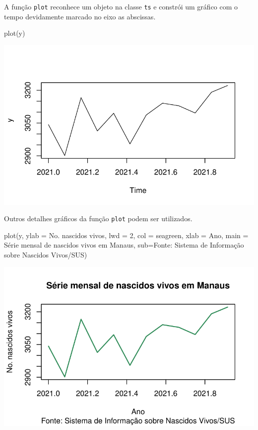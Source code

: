 \documentclass[
  letterpaper,
  DIV=11,
  numbers=noendperiod]{scrreprt}
\newenvironment{Shaded}{\begin{snugshade}}{\end{snugshade}}
\newcommand{\AttributeTok}[1]{\textcolor[rgb]{0.40,0.45,0.13}{#1}}
\newcommand{\DecValTok}[1]{\textcolor[rgb]{0.68,0.00,0.00}{#1}}
\newcommand{\FunctionTok}[1]{\textcolor[rgb]{0.28,0.35,0.67}{#1}}
\newcommand{\NormalTok}[1]{\textcolor[rgb]{0.00,0.23,0.31}{#1}}
\newcommand{\StringTok}[1]{\textcolor[rgb]{0.13,0.47,0.30}{#1}}
\begin{document}
A função \texttt{plot} reconhece um objeto na classe \texttt{ts} e
constrói um gráfico com o tempo devidamente marcado no eixo as
abscissas.

\begin{Shaded}
\begin{Highlighting}[]
\FunctionTok{plot}\NormalTok{(y)}
\end{Highlighting}
\end{Shaded}

\includegraphics{intro_files/figure-pdf/unnamed-chunk-2-1.pdf}

Outros detalhes gráficos da função \texttt{plot} podem ser utilizados.

\begin{Shaded}
\begin{Highlighting}[]
\FunctionTok{plot}\NormalTok{(y, }\AttributeTok{ylab =} \StringTok{\textquotesingle{}No. nascidos vivos\textquotesingle{}}\NormalTok{, }\AttributeTok{lwd =} \DecValTok{2}\NormalTok{, }\AttributeTok{col =} \StringTok{\textquotesingle{}seagreen\textquotesingle{}}\NormalTok{, }\AttributeTok{xlab =} \StringTok{\textquotesingle{}Ano\textquotesingle{}}\NormalTok{, }\AttributeTok{main =} \StringTok{\textquotesingle{}Série mensal de nascidos vivos em Manaus\textquotesingle{}}\NormalTok{, }\AttributeTok{sub=}\StringTok{\textquotesingle{}Fonte: Sistema de Informação sobre Nascidos Vivos/SUS\textquotesingle{}}\NormalTok{)}
\end{Highlighting}
\end{Shaded}

\includegraphics{intro_files/figure-pdf/unnamed-chunk-3-1.pdf}
\end{document}
